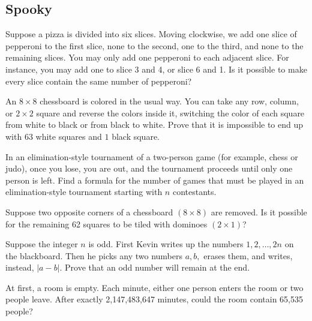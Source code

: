 \documentclass{article}
\begin{document}
\subsection*{Spooky}

    \begin{exercise}
        Suppose a pizza is divided into six slices. Moving clockwise, we add one slice of pepperoni to the first slice, none to the second, one to the third, and none to the remaining slices. You may only add one pepperoni to each adjacent slice. For instance, you may add one to slice 3 and 4, or slice 6 and 1. Is it possible to make every slice contain the same number of pepperoni?
    \end{exercise}
    
    \begin{exercise}
        An $8\times 8$ chessboard is colored in the usual way.
        You can take any row, column, or $2\times2$ square and reverse the colors inside it, switching the color of each square from white to black or from black to white.
        Prove that it is impossible to end up with $63$ white squares and $1$ black square.
    \end{exercise}

    \begin{exercise}
        In an elimination-style tournament of a two-person game (for example, chess or judo), once you lose, you are out, and the tournament proceeds until only one person is left. Find a formula for the number of games that must be played in an elimination-style tournament starting with \(n\) contestants.
    \end{exercise}
    
    \begin{exercise}
            Suppose two opposite corners of a chessboard \((8\times 8)\) are removed. Is it possible for the remaining 62 squares to be tiled with dominoes \((2\times 1)\)?
        \end{exercise}

    \begin{exercise}
        Suppose the integer \(n\) is odd. First Kevin writes up the numbers \(1, 2, \ldots, 2n\) on the blackboard. Then he picks any two numbers \(a, b,\) erases them, and writes, instead, \(|a-b|\). Prove that an odd number will remain at the end.
    \end{exercise}

    \begin{exercise}
        At first, a room is empty. Each minute, either one person enters the room or two people leave. After exactly 2,147,483,647 minutes, could the room contain 65,535 people?
    \end{exercise}
        
\end{document}
